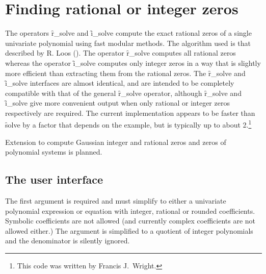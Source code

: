 \section{Finding rational or integer zeros}

\iffalse
  The operators \f{r\_solve} and \f{i_\solve}  compute
  respectively the exact rational or integer zeros of a single
  univariate polynomial using fast modular methods.


  \subsection{Introduction}
  \fi
{}
\hypertarget{operator:I_SOLVE}{}
\hypertarget{operator:R_SOLVE}{}
The operators \f{r\_solve} and \f{i\_solve}  compute the exact rational zeros
of a single univariate polynomial using fast modular methods.  The
algorithm used is that described by R. Loos (\cite{Loos:1983a}).
The operator \f{r\_solve} computes
all rational zeros whereas the operator \f{i\_solve} computes only
integer zeros in a way that is slightly more efficient than extracting
them from the rational zeros.  The \f{r\_solve} and \f{i\_solve}
interfaces are almost identical, and are intended to be completely
compatible with that of the general \f{r\_solve} operator, although
\f{r\_solve} and \f{i\_solve} give more convenient output when
only rational or integer zeros respectively are required.  The current
implementation appears to be faster than \f{solve} by a factor that
depends on the example, but is typically up to about 2.\footnote{This code was written by Francis J.~Wright.}

Extension to compute Gaussian integer and rational
zeros and zeros of polynomial systems is planned.


\subsection{The user interface}

The first argument is required and must simplify to either a
univariate polynomial expression or equation with integer, rational or
rounded coefficients.  Symbolic coefficients are not allowed (and
currently complex coefficients are not allowed either.)  The argument
is simplified to a quotient of integer polynomials and the denominator
is silently ignored.

